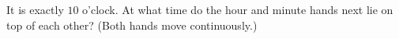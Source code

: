 It is exactly $10$ o'clock. At what time do the hour and minute hands next lie on top of each other? (Both hands move continuously.)

